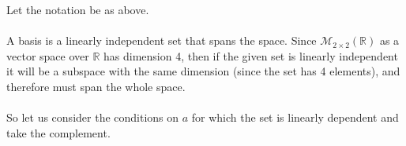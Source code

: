\documentclass{article}
\begin{document}
\begin{solution}
Let the notation be as above.

\paragraph{}
A basis is a linearly independent set that spans the space. Since $\mathcal{M}_{2\times 2}\left( \mathbb{R} \right)$ as a vector space over $\mathbb{R}$ has dimension 4, then if the given set is linearly independent it will be a subspace with the same dimension (since the set has 4 elements), and therefore must span the whole space.

\paragraph{}
So let us consider the conditions on $a$ for which the set is linearly dependent and take the complement.


\end{solution}
\end{document}
